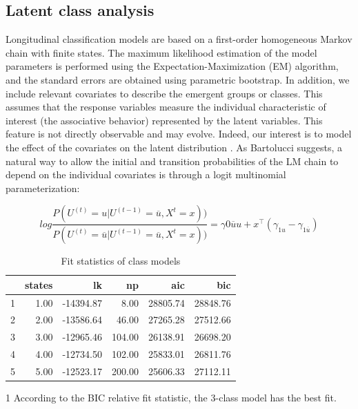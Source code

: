 \subsection{Latent class analysis}

Longitudinal classification models are based on a first-order homogeneous Markov chain with finite states. The maximum likelihood estimation of the model parameters is performed using the Expectation-Maximization (EM) algorithm, and the standard errors are obtained using parametric bootstrap. In addition, we include relevant covariates to describe the emergent groups or classes. This assumes that the response variables measure the individual characteristic of interest (the associative behavior) represented by the latent variables. This feature is not directly observable and may evolve. Indeed, our interest is to model the effect of the covariates on the latent distribution \parencite{bartolucci_latent_2009}. As Bartolucci \citeyear{bartolucci_latent_2015} suggests, a natural way to allow the initial and transition probabilities of the LM chain to depend on the individual covariates is through a logit multinomial parameterization:

\begin{equation}
log\frac{P(U^{(t)} = u|U^{(t-1)}= \overline{u}, X^{t}=x))}{P(U^{(t)} = \overline{u}|U^{(t-1)}= \overline{u}, X^{t}=x))} = \gamma 0 \overline{u}u + x^\top (\gamma_{1u} - \gamma_{1\overline{u}})
\end{equation}





\begin{table}[H]
\centering
\begin{threeparttable}
\caption{\label{demo-table} Fit statistics of class models}
\begin{tabular}{rrrrrr}
  \hline
 & states & lk & np & aic & bic \\ 
  \hline
1 & 1.00 & -14394.87 & 8.00 & 28805.74 & 28848.76 \\ 
  2 & 2.00 & -13586.64 & 46.00 & 27265.28 & 27512.66 \\ 
  3 & 3.00 & -12965.46 & 104.00 & 26138.91 & 26698.20 \\ 
  4 & 4.00 & -12734.50 & 102.00 & 25833.01 & 26811.76 \\ 
  5 & 5.00 & -12523.17 & 200.00 & 25606.33 & 27112.11 \\ 
   \hline
\end{tabular}
\begin{tablenotes}
    \item[1] According to the BIC relative fit statistic, the 3-class model has the best fit.
  \end{tablenotes}
\end{threeparttable}
\end{table}

